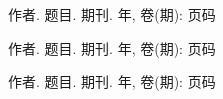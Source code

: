 {}

\begin{publist}
\item 作者. 题目. 期刊. 年, 卷(期): 页码

\item 作者. 题目. 期刊. 年, 卷(期): 页码

\item 作者. 题目. 期刊. 年, 卷(期): 页码
\end{publist}
